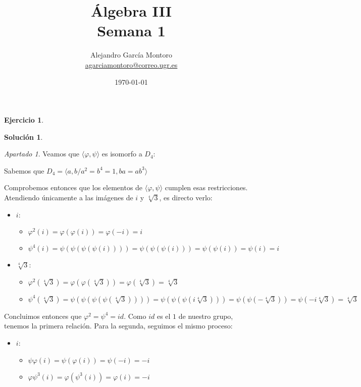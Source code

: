 \documentclass[a4paper, 11pt]{article}
\title{Álgebra III \\ Semana 1}
\author{Alejandro García Montoro\\
    \href{mailto:agarciamontoro@correo.ugr.es}{agarciamontoro@correo.ugr.es}}
\date{\today}
\theoremstyle{definition}
\newtheorem{ejercicio}{Ejercicio}
\newtheorem*{solucion}{Solución}
\theoremstyle{remark}
\newtheorem{apartado}{Apartado}[ejercicio]
\begin{document}
  \maketitle

  \begin{ejercicio}
  \end{ejercicio}

  \begin{solucion}
      \begin{apartado}
          Veamos que $\langle\varphi,\psi\rangle$ es isomorfo a $D_4$:

          Sabemos que $D_4 = \langle a,b / a^2 = b^4 = 1, ba = ab^3 \rangle$

          Comprobemos entonces que los elementos de $\langle\varphi,\psi\rangle$ cumplen esas restricciones. Atendiendo únicamente a las imágenes de $i$ y $\sqrt[4]{3}$, es directo verlo:

          \begin{itemize}
              \item \textbf{$i$}:
              \begin{itemize}
                  \item $\varphi^2(i) = \varphi(\varphi(i)) = \varphi(-i) = i$
                  \item $\psi^4(i) = \psi(\psi(\psi(\psi(i)))) = \psi(\psi(\psi(i))) = \psi(\psi(i)) = \psi(i) = i$
              \end{itemize}

              \item \textbf{$\sqrt[4]{3}$}:
              \begin{itemize}
                  \item $\varphi^2(\sqrt[4]{3}) = \varphi(\varphi(\sqrt[4]{3})) = \varphi(\sqrt[4]{3}) = \sqrt[4]{3}$
                  \item $\psi^4(\sqrt[4]{3}) = \psi(\psi(\psi(\psi(\sqrt[4]{3})))) = \psi(\psi(\psi(i\sqrt[4]{3}))) = \psi(\psi(-\sqrt[4]{3})) = \psi(-i\sqrt[4]{3}) = \sqrt[4]{3}$
              \end{itemize}
          \end{itemize}

          Concluimos entonces que $\varphi^2 = \psi^4 = id$. Como $id$ es el $1$ de nuestro grupo, tenemos la primera relación. Para la segunda, seguimos el mismo proceso:

          \begin{itemize}
              \item \textbf{$i$}:
              \begin{itemize}
                  \item $\psi\varphi(i) = \psi(\varphi(i)) = \psi(-i) = -i$
                  \item $\varphi\psi^3(i) = \varphi(\psi^3(i)) = \varphi(i) = -i$
              \end{itemize}


\end{itemize}
\end{apartado}
\end{solucion}
\end{document}

